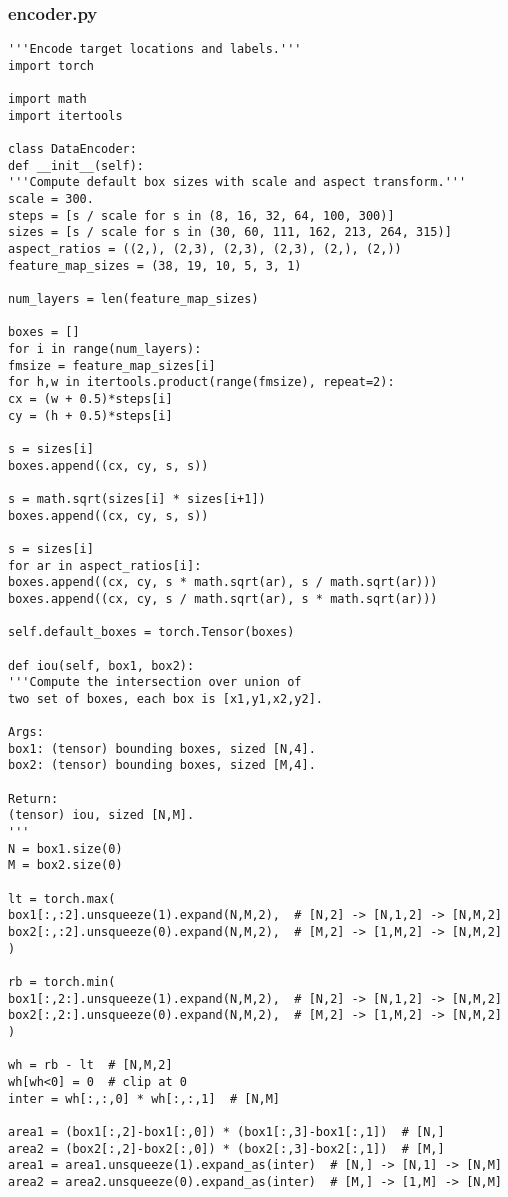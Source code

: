 \subsubsection*{encoder.py}
\begin{lstlisting}
'''Encode target locations and labels.'''
import torch

import math
import itertools

class DataEncoder:
def __init__(self):
'''Compute default box sizes with scale and aspect transform.'''
scale = 300.
steps = [s / scale for s in (8, 16, 32, 64, 100, 300)]
sizes = [s / scale for s in (30, 60, 111, 162, 213, 264, 315)]
aspect_ratios = ((2,), (2,3), (2,3), (2,3), (2,), (2,))
feature_map_sizes = (38, 19, 10, 5, 3, 1)

num_layers = len(feature_map_sizes)

boxes = []
for i in range(num_layers):
fmsize = feature_map_sizes[i]
for h,w in itertools.product(range(fmsize), repeat=2):
cx = (w + 0.5)*steps[i]
cy = (h + 0.5)*steps[i]

s = sizes[i]
boxes.append((cx, cy, s, s))

s = math.sqrt(sizes[i] * sizes[i+1])
boxes.append((cx, cy, s, s))

s = sizes[i]
for ar in aspect_ratios[i]:
boxes.append((cx, cy, s * math.sqrt(ar), s / math.sqrt(ar)))
boxes.append((cx, cy, s / math.sqrt(ar), s * math.sqrt(ar)))

self.default_boxes = torch.Tensor(boxes)

def iou(self, box1, box2):
'''Compute the intersection over union of 
two set of boxes, each box is [x1,y1,x2,y2].

Args:
box1: (tensor) bounding boxes, sized [N,4].
box2: (tensor) bounding boxes, sized [M,4].

Return:
(tensor) iou, sized [N,M].
'''
N = box1.size(0)
M = box2.size(0)

lt = torch.max(
box1[:,:2].unsqueeze(1).expand(N,M,2),  # [N,2] -> [N,1,2] -> [N,M,2]
box2[:,:2].unsqueeze(0).expand(N,M,2),  # [M,2] -> [1,M,2] -> [N,M,2]
)

rb = torch.min(
box1[:,2:].unsqueeze(1).expand(N,M,2),  # [N,2] -> [N,1,2] -> [N,M,2]
box2[:,2:].unsqueeze(0).expand(N,M,2),  # [M,2] -> [1,M,2] -> [N,M,2]
)

wh = rb - lt  # [N,M,2]
wh[wh<0] = 0  # clip at 0
inter = wh[:,:,0] * wh[:,:,1]  # [N,M]

area1 = (box1[:,2]-box1[:,0]) * (box1[:,3]-box1[:,1])  # [N,]
area2 = (box2[:,2]-box2[:,0]) * (box2[:,3]-box2[:,1])  # [M,]
area1 = area1.unsqueeze(1).expand_as(inter)  # [N,] -> [N,1] -> [N,M]
area2 = area2.unsqueeze(0).expand_as(inter)  # [M,] -> [1,M] -> [N,M]


\end{lstlisting}
